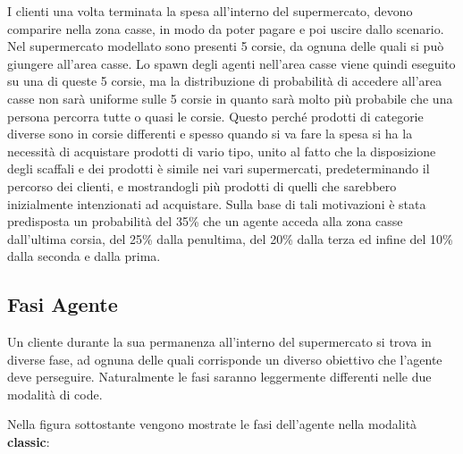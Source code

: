 I clienti una volta terminata la spesa all'interno del supermercato, devono comparire nella zona casse, in modo da poter pagare e poi uscire dallo scenario. Nel supermercato modellato sono presenti 5 corsie, da ognuna delle quali si può giungere all'area casse. Lo spawn degli agenti nell'area casse viene quindi eseguito su una di queste 5 corsie, ma la distribuzione di probabilità di accedere all'area casse non sarà uniforme sulle 5 corsie in quanto sarà molto più probabile che una persona percorra tutte o quasi le corsie. Questo perché prodotti di categorie diverse sono in corsie differenti e spesso quando si va fare la spesa si ha la necessità di acquistare prodotti di vario tipo, unito al fatto che la disposizione degli scaffali e dei prodotti è simile nei vari supermercati, predeterminando il percorso dei clienti, e mostrandogli più prodotti di quelli che sarebbero inizialmente intenzionati ad acquistare. Sulla base di tali motivazioni è stata predisposta un probabilità del 35\% che un agente acceda alla zona casse dall'ultima corsia, del 25\% dalla penultima, del 20\% dalla terza ed infine del 10\% dalla seconda e dalla prima.  

\subsection{Fasi Agente}

Un cliente durante la sua permanenza all'interno del supermercato si trova in diverse fase, ad ognuna delle quali corrisponde un diverso obiettivo che l'agente deve perseguire. Naturalmente le fasi saranno leggermente differenti nelle due modalità di code. 

Nella figura sottostante vengono mostrate le fasi dell'agente nella modalità \textbf{classic}:

